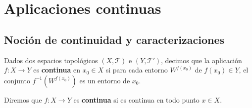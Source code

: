 \chapter{Aplicaciones continuas}
\section{Noción de continuidad y caracterizaciones}
\begin{definition}
Dados dos espacios topológicos $\displaystyle \left(X, \mathcal{T}\right) $ e $\displaystyle \left(Y, \mathcal{T}'\right) $, decimos que la aplicación $\displaystyle f : X \to Y $ es \textbf{continua} en $\displaystyle x_{0} \in X $ si para cada entorno $\displaystyle W^{f\left(x_{0}\right)} $ de $\displaystyle f\left(x_{0}\right)\in Y $, el conjunto $\displaystyle f^{-1}\left(W^{f\left(x_{0}\right)}\right) $ es un entorno de $\displaystyle x_{0} $. 
\end{definition}
\begin{notation}
Diremos que $\displaystyle f : X \to Y$ es \textbf{continua} si es continua en todo punto $\displaystyle x \in X $. 
\end{notation}

